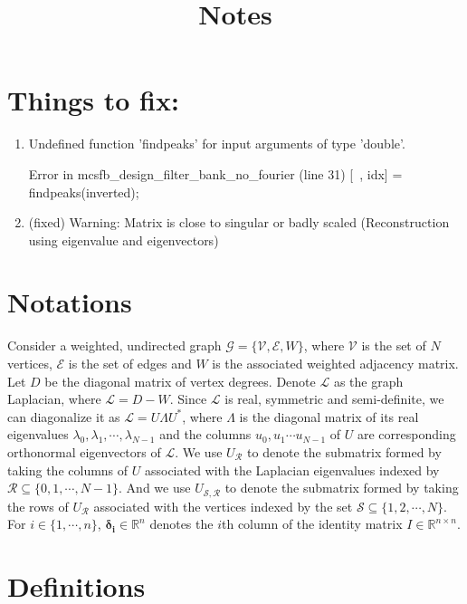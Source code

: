 \documentclass[a4paper]{article}
\title{Notes}
\newcommand{\R}{\mathcal{R}}
\newcommand{\RR}{\mathbb{R}}
\newcommand{\N}{\mathbb{N}}
\newcommand{\G}{\mathcal{G}}
\newcommand{\V}{\mathcal{V}}
\newcommand{\E}{\mathcal{E}}
\newcommand{\La}{\mathcal{L}}
\newcommand{\UR}{U_{\mathcal{R}}}
\theoremstyle{definition}
\newtheorem*{definition}{Definition}
\begin{document}
\maketitle

\newpage


\section{Things to fix:}
\begin{enumerate}
\item Undefined function 'findpeaks' for input
arguments of type 'double'.

Error in mcsfb\_design\_filter\_bank\_no\_fourier
(line 31)
    [~, idx] = findpeaks(inverted); 
    
\item (fixed) Warning: Matrix is close to singular or badly scaled (Reconstruction using eigenvalue and eigenvectors)

\end{enumerate}

\section{Notations}
Consider a weighted, undirected graph $\G = \{ \V, \E, W\}$, where $\V$ is the set of $N$ vertices, $\E$ is the set of edges and $W$ is the associated weighted adjacency matrix. Let $D$ be the diagonal matrix of vertex degrees. Denote $\La$ as the graph Laplacian, where $\La = D-W$. Since $\La$ is real, symmetric and semi-definite, we can diagonalize it as $\La =U\Lambda U^*$, where $\Lambda$ is the diagonal matrix of its real eigenvalues $\lambda_0, \lambda_1,\cdots, \lambda_{N-1}$ and the columns $u_0, u_1 \cdots u_{N-1}$ of $U$ are corresponding orthonormal eigenvectors of $\La$. We use $\UR$ to denote the submatrix formed by taking the columns of $U$ associated with the Laplacian eigenvalues indexed by $\mathcal{R} \subseteq \{0,1,\cdots,N-1\}$. And we use $U_{\mathcal{S},\mathcal{R}}$ to denote the submatrix formed by taking the rows of $U_{\mathcal{R}}$ associated with the vertices indexed by the set $\mathcal{S} \subseteq \{1,2,\cdots, N\}$. For $i \in \{1,\cdots,n\}$, $\bm{\delta_i} \in \RR^n$ denotes the $i$th column of the identity matrix $I \in \RR^{n\times n}.$

\medskip

\section{Definitions}
\end{document}
